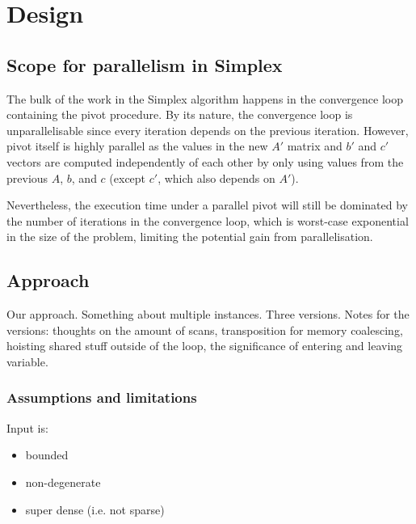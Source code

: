 \section{Design}

\subsection{Scope for parallelism in Simplex}
The bulk of the work in the Simplex algorithm happens in the convergence loop containing the pivot procedure. By its nature, the convergence loop is unparallelisable since every iteration depends on the previous iteration. However, pivot itself is highly parallel as the values in the new $A'$ matrix and $b'$ and $c'$  vectors are computed independently of each other by only using values from the previous $A$, $b$, and $c$ (except $c'$, which also depends on $A'$).

Nevertheless, the execution time under a parallel pivot will still be dominated by the number of iterations in the convergence loop, which is worst-case exponential in the size of the problem, limiting the potential gain from parallelisation.

\subsection{Approach}
Our approach. Something about multiple instances. Three versions. Notes for the versions: thoughts on the amount of scans, transposition for memory coalescing, hoisting shared stuff outside of the loop, the significance of entering and leaving variable.

\subsubsection{Assumptions and limitations}
Input is:
\begin{itemize}
\item bounded
\item non-degenerate
\item super dense (i.e. not sparse)
\end{itemize}

